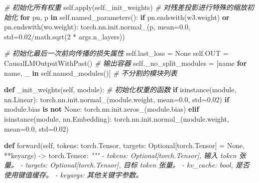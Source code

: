 \documentclass[
]{article}
\newenvironment{Shaded}{}{}
\newcommand{\BuiltInTok}[1]{\textcolor[rgb]{0.00,0.50,0.00}{#1}}
\newcommand{\CommentTok}[1]{\textcolor[rgb]{0.38,0.63,0.69}{\textit{#1}}}
\newcommand{\ControlFlowTok}[1]{\textcolor[rgb]{0.00,0.44,0.13}{\textbf{#1}}}
\newcommand{\DecValTok}[1]{\textcolor[rgb]{0.25,0.63,0.44}{#1}}
\newcommand{\FloatTok}[1]{\textcolor[rgb]{0.25,0.63,0.44}{#1}}
\newcommand{\KeywordTok}[1]{\textcolor[rgb]{0.00,0.44,0.13}{\textbf{#1}}}
\newcommand{\NormalTok}[1]{#1}
\newcommand{\OperatorTok}[1]{\textcolor[rgb]{0.40,0.40,0.40}{#1}}
\newcommand{\StringTok}[1]{\textcolor[rgb]{0.25,0.44,0.63}{#1}}
\newcommand{\VariableTok}[1]{\textcolor[rgb]{0.10,0.09,0.49}{#1}}
\begin{document}
\begin{Shaded}
\begin{Highlighting}[]
        \CommentTok{\# 初始化所有权重}
        \VariableTok{self}\NormalTok{.}\BuiltInTok{apply}\NormalTok{(}\VariableTok{self}\NormalTok{.\_init\_weights)}
        \CommentTok{\# 对残差投影进行特殊的缩放初始化}
        \ControlFlowTok{for}\NormalTok{ pn, p }\KeywordTok{in} \VariableTok{self}\NormalTok{.named\_parameters():}
            \ControlFlowTok{if}\NormalTok{ pn.endswith(}\StringTok{\textquotesingle{}w3.weight\textquotesingle{}}\NormalTok{) }\KeywordTok{or}\NormalTok{ pn.endswith(}\StringTok{\textquotesingle{}wo.weight\textquotesingle{}}\NormalTok{):}
\NormalTok{                torch.nn.init.normal\_(p, mean}\OperatorTok{=}\FloatTok{0.0}\NormalTok{, std}\OperatorTok{=}\FloatTok{0.02}\OperatorTok{/}\NormalTok{math.sqrt(}\DecValTok{2} \OperatorTok{*}\NormalTok{ args.n\_layers))}

        \CommentTok{\# 初始化最后一次前向传播的损失属性}
        \VariableTok{self}\NormalTok{.last\_loss }\OperatorTok{=} \VariableTok{None}
        \VariableTok{self}\NormalTok{.OUT }\OperatorTok{=}\NormalTok{ CausalLMOutputWithPast()  }\CommentTok{\# 输出容器}
        \VariableTok{self}\NormalTok{.\_no\_split\_modules }\OperatorTok{=}\NormalTok{ [name }\ControlFlowTok{for}\NormalTok{ name, \_ }\KeywordTok{in} \VariableTok{self}\NormalTok{.named\_modules()]  }\CommentTok{\# 不分割的模块列表}

    \KeywordTok{def}\NormalTok{ \_init\_weights(}\VariableTok{self}\NormalTok{, module):}
        \CommentTok{\# 初始化权重的函数}
        \ControlFlowTok{if} \BuiltInTok{isinstance}\NormalTok{(module, nn.Linear):}
\NormalTok{            torch.nn.init.normal\_(module.weight, mean}\OperatorTok{=}\FloatTok{0.0}\NormalTok{, std}\OperatorTok{=}\FloatTok{0.02}\NormalTok{)}
            \ControlFlowTok{if}\NormalTok{ module.bias }\KeywordTok{is} \KeywordTok{not} \VariableTok{None}\NormalTok{:}
\NormalTok{                torch.nn.init.zeros\_(module.bias)}
        \ControlFlowTok{elif} \BuiltInTok{isinstance}\NormalTok{(module, nn.Embedding):}
\NormalTok{            torch.nn.init.normal\_(module.weight, mean}\OperatorTok{=}\FloatTok{0.0}\NormalTok{, std}\OperatorTok{=}\FloatTok{0.02}\NormalTok{)}
    
    \KeywordTok{def}\NormalTok{ forward(}\VariableTok{self}\NormalTok{, tokens: torch.Tensor, targets: Optional[torch.Tensor] }\OperatorTok{=} \VariableTok{None}\NormalTok{, }\OperatorTok{**}\NormalTok{keyargs) }\OperatorTok{{-}\textgreater{}}\NormalTok{ torch.Tensor:}
        \CommentTok{"""}
\CommentTok{        {-} tokens: Optional[torch.Tensor], 输入 token 张量。}
\CommentTok{        {-} targets: Optional[torch.Tensor], 目标 token 张量。}
\CommentTok{        {-} kv\_cache: bool, 是否使用键值缓存。}
\CommentTok{        {-} keyargs: 其他关键字参数。}


\end{Highlighting}
\end{Shaded}
\end{document}
